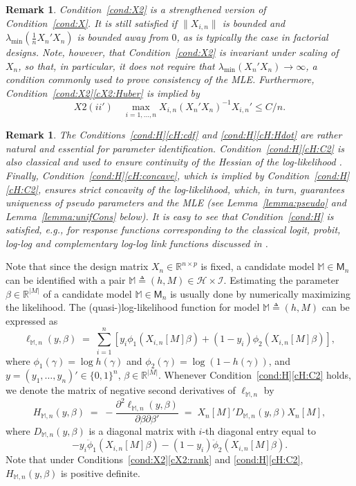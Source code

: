 \documentclass[preprint]{imsart}
\newcommand{\R}{{\mathbb R}}
\newcommand{\M}{\mathbb M}
\newcommand{\lmin}{\lambda_{\min}}
\newtheorem{remark}[theorem]{Remark}
\numberwithin{equation}{section}
\begin{document}
\begin{remark}
Condition~\ref{cond:X2} is a strengthened version of Condition~\ref{cond:X}. It is still satisfied if $\|X_{i,n}\|$ is bounded and $\lmin(\frac{1}{n}X_n'X_n)$ is bounded away from $0$, as is typically the case in factorial designs. Note, however, that Condition~\ref{cond:X2} is invariant under scaling of $X_n$, so that, in particular, it does not require that $\lmin(X_n'X_n)\to\infty$, a condition commonly used to prove consistency of the MLE. Furthermore, Condition~\ref{cond:X2}\eqref{cX2:Huber} is implied by 
$$
X2(ii')\quad\max_{i=1,\dots, n} X_{i,n}(X_n'X_n)^{-1}X_{i,n}' \le C/n.
$$
\end{remark}

\begin{remark}
The Conditions~\ref{cond:H}\eqref{cH:cdf} and \ref{cond:H}\eqref{cH:Hdot} are rather natural and essential for parameter identification. Condition~\ref{cond:H}\eqref{cH:C2} is also classical and used to ensure continuity of the Hessian of the log-likelihood \citep[cf.][]{Fahrmeir85, Fahrmeir90}. Finally, Condition~\ref{cond:H}\eqref{cH:concave}, which is implied by Condition~\ref{cond:H}\eqref{cH:C2}, ensures strict concavity of the log-likelihood, which, in turn, guarantees uniqueness of pseudo parameters and the MLE (see Lemma~\ref{lemma:pseudo} and Lemma~\ref{lemma:unifCons} below). 
It is easy to see that Condition~\ref{cond:H} is satisfied, e.g., for response functions corresponding to the classical logit, probit, log-log and complementary log-log link functions discussed in \citet[][p.108]{McCullagh89}.
\end{remark}

Note that since the design matrix $X_n\in\R^{n\times p}$ is fixed, a candidate model $\mathbb M \in \mathsf{M}_n$ can be identified with a pair $\mathbb M \triangleq (h, M) \in \mathcal H\times \mathcal I$. Estimating the parameter $\beta\in\R^{|M|}$ of a candidate model $\M\in\mathsf{M}_n$ is usually done by numerically maximizing the likelihood. The (quasi-)log-likelihood function for model $\M \triangleq (h,M)$ can be expressed as
\begin{equation*}
\ell_{\M,n}(y,\beta) \;=\; \sum_{i=1}^n \left[ y_i \phi_1(X_{i,n}[M]\beta) + (1-y_i)\phi_2(X_{i,n}[M]\beta)\right],
\end{equation*}
where $\phi_1(\gamma) = \log h(\gamma)$ and $\phi_2(\gamma) = \log (1-h(\gamma))$, and $y = (y_1,\dots, y_n)'\in\{0,1\}^n$, $\beta\in\R^{|M|}$. Whenever Condition~\ref{cond:H}\eqref{cH:C2} holds, we denote the matrix of negative second derivatives of $\ell_{\M,n}$ by
$$
H_{\M,n}(y,\beta) \;=\; -\frac{\partial^2\ell_{\M,n}(y,\beta)}{\partial \beta \partial \beta'}
\;=\; X_n[M]'D_{\M,n}(y,\beta)X_n[M],
$$
where $D_{\M,n}(y,\beta)$ is a diagonal matrix with $i$-th diagonal entry equal to 
$$-y_i \ddot{\phi}_1(X_{i,n}[M]\beta) - (1-y_i)\ddot{\phi}_2(X_{i,n}[M]\beta).$$
Note that under Conditions~\ref{cond:X2}\eqref{cX2:rank} and \ref{cond:H}\eqref{cH:C2}, $H_{\M,n}(y,\beta)$ is positive definite.
\end{document}
